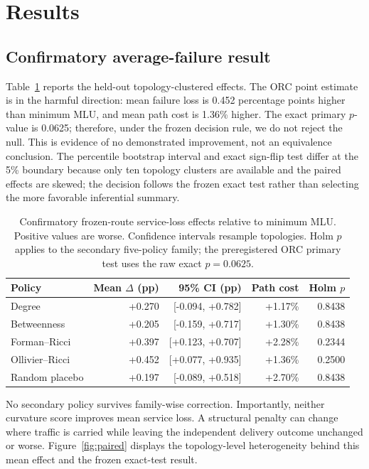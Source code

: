\documentclass[preprint,12pt]{elsarticle}
\begin{document}
\section{Results}

\subsection{Confirmatory average-failure result}

Table~\ref{tab:confirmatory} reports the held-out topology-clustered effects.
The ORC point estimate is in the harmful direction: mean failure loss is 0.452
percentage points higher than minimum MLU, and mean path cost is 1.36\% higher.
The exact primary $p$-value is 0.0625; therefore, under the frozen decision rule,
we do not reject the null. This is evidence of no demonstrated improvement, not
an equivalence conclusion. The percentile bootstrap interval and exact
sign-flip test differ at the 5\% boundary because only ten topology clusters are
available and the paired effects are skewed; the decision follows the frozen
exact test rather than selecting the more favorable inferential summary.

\begin{table}[t]
\centering
\caption{Confirmatory frozen-route service-loss effects relative to minimum
MLU. Positive values are worse. Confidence intervals resample topologies. Holm
$p$ applies to the secondary five-policy family; the preregistered ORC primary
test uses the raw exact $p=0.0625$.}
\label{tab:confirmatory}
\begin{tabular}{lrrrr}
\toprule
Policy & Mean $\Delta$ (pp) & 95\% CI (pp) & Path cost & Holm $p$ \\
\midrule
Degree & +0.270 & [-0.094, +0.782] & +1.17\% & 0.8438 \\
Betweenness & +0.205 & [-0.159, +0.717] & +1.30\% & 0.8438 \\
Forman--Ricci & +0.397 & [+0.123, +0.707] & +2.28\% & 0.2344 \\
Ollivier--Ricci & +0.452 & [+0.077, +0.935] & +1.36\% & 0.2500 \\
Random placebo & +0.197 & [-0.089, +0.518] & +2.70\% & 0.8438 \\
\bottomrule
\end{tabular}
\end{table}

No secondary policy survives family-wise correction. Importantly, neither
curvature score improves mean service loss. A structural penalty can change
where traffic is carried while leaving the independent delivery outcome
unchanged or worse. Figure~\ref{fig:paired} displays the topology-level
heterogeneity behind this mean effect and the frozen exact-test result.
\end{document}
